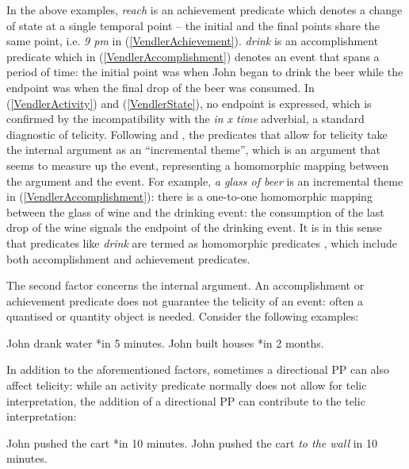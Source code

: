 \documentclass[output=paper]{langsci/langscibook}
\begin{document}
In the above examples, \emph{reach} is an achievement predicate which denotes a
change of state at a single temporal point -- the initial and the final points
share the same point, i.e. \emph{9 pm} in (\ref{VendlerAchievement}).
\emph{drink} is an accomplishment predicate which in
(\ref{VendlerAccomplishment}) denotes an event that spans a period of time: the
initial point was when John began to drink the beer while the endpoint was when
the final drop of the beer was consumed. In (\ref{VendlerActivity}) and
(\ref{VendlerState}), no endpoint is expressed, which is confirmed by the
incompatibility with the \emph{in x time} adverbial, a standard diagnostic of
telicity. Following \textcite{dowty1991thematic} and
\textcite{Rothstein2004}, the predicates that allow for telicity take
the internal argument as an ``incremental theme'', which is an argument that
seems to measure up the event, representing a homomorphic mapping between the
argument and the event. For example, \emph{a glass of beer} is an incremental
theme in (\ref{VendlerAccomplishment}): there is a one-to-one homomorphic
mapping between the glass of wine and the drinking event: the consumption of
the last drop of the wine signals the endpoint of the drinking event. It is in
this sense that predicates like \emph{drink} are termed as homomorphic
predicates \citep{krifka1992,krifka1998originstelicity,filip1997}, which
include both accomplishment and achievement predicates.

The second factor concerns the internal argument. An accomplishment or
achievement predicate does not guarantee the telicity of an event: often a
quantised or quantity object
\citep{krifka1992,krifka1998originstelicity,Borer2005a,Borer2005b}
is needed. Consider the following examples:

\begin{exe}
\ex\begin{xlist}
	\ex John drank water *in 5 minutes.
    \ex John built houses *in 2 months.
\end{xlist}
\end{exe}

In addition to the aforementioned factors, sometimes a directional PP can also
affect telicity: while an activity predicate normally does not allow for telic
interpretation, the addition of a directional PP can contribute to the telic
interpretation:

\begin{exe}
\ex\begin{xlist}
	\ex John pushed the cart *in 10 minutes.
    \ex John pushed the cart \emph{to the wall} in 10 minutes.
\end{xlist}
\end{exe}
\end{document}
